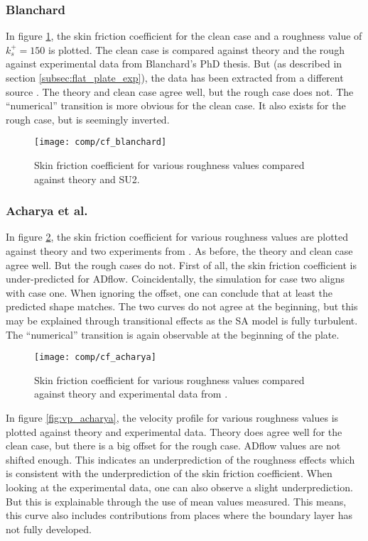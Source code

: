 \subsubsection{Blanchard}
In figure \ref{fig:cf_blanchard}, the skin friction coefficient for the clean
case and a roughness value of $k_{s}^{+} = 150$ is plotted. The clean case is
compared against theory and the rough against experimental data from Blanchard's
PhD thesis. But (as described in section \ref{subsec:flat_plate_exp}), the data
has been extracted from a different source \cite{sa_rough}. The theory and clean
case agree well, but the rough case does not. The ``numerical'' transition is
more obvious for the clean case. It also exists for the rough case, but is
seemingly inverted.

\begin{figure}[H] \centering
  \texttt{[image: comp/cf\_blanchard]}
    \caption{Skin friction coefficient for various roughness values compared
      against theory and SU2.}
    \label{fig:cf_blanchard}
\end{figure}


\subsubsection{Acharya et al.}
In figure \ref{fig:cf_acharya}, the skin friction coefficient for various
roughness values are plotted against theory and two experiments from
\cite{Acharya1986}. As before, the theory and clean case agree well. But the
rough cases do not. First of all, the skin friction coefficient is
under-predicted for ADflow. Coincidentally, the simulation for case two aligns
with case one. When ignoring the offset, one can conclude that at least the
predicted shape matches. The two curves do not agree at the beginning, but this
may be explained through transitional effects as the SA model is fully
turbulent. The ``numerical'' transition is again observable at the beginning of
the plate.

\begin{figure}[H] \centering
  \texttt{[image: comp/cf\_acharya]}
    \caption{Skin friction coefficient for various roughness values compared
      against theory and experimental data from \cite{Acharya1986}.}
    \label{fig:cf_acharya}
\end{figure}

\noindent In figure \ref{fig:vp_acharya}, the velocity profile for various
roughness values is plotted against theory and experimental data. Theory does
agree well for the clean case, but there is a big offset for the rough case.
ADflow values are not shifted enough. This indicates an underprediction of the
roughness effects which is consistent with the underprediction of the skin
friction coefficient. When looking at the experimental data, one can also
observe a slight underprediction. But this is explainable through the use of
mean values measured. This means, this curve also includes contributions from
places where the boundary layer has not fully developed.

